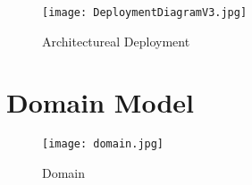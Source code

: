 \documentclass[10pt]{article}
\begin{document}
\begin{figure}
  	\texttt{[image: DeploymentDiagramV3.jpg]}
  	\caption{Architectureal Deployment}
	\label{Architectureal Deployment}
	\end{figure}


\section*{Domain Model}
\pagebreak
	\begin{figure}
  	\texttt{[image: domain.jpg]}
  	\caption{Domain}
	\label{Domain Model}
	\end{figure}
\end{document}

